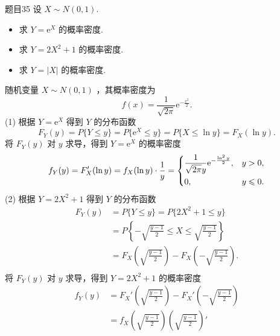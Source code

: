 \begin{question}{题目35}
    设 $X \sim N(0,1)$.
    \begin{itemize}
        \item [(1)] 求 $Y=\mathrm{e}^X$ 的概率密度.
        \item [(2)] 求 $Y=2X^2 + 1$ 的概率密度.
        \item [(3)] 求 $Y=|X|$ 的概率密度.
    \end{itemize}
\end{question}
\begin{solution}
    随机变量 $X \sim N(0,1)$ ，其概率密度为
    $$
        f(x) = \frac{1}{\sqrt{2\pi}}\mathrm{e}^{-\frac{x^2}{2}}.
    $$
    (1) 根据 $Y = \mathrm{e}^X$ 得到 $Y$ 的分布函数
    $$
        F_Y(y)
        = P\{Y \leqslant y\}
        = P\{\mathrm{e}^X \leqslant y\}
        = P\{X \leqslant \ln y\}
        = F_X(\ln{y}).
    $$
    将 $F_Y(y)$ 对 $y$ 求导，得到 $Y=\mathrm{e}^X$ 的概率密度
    $$
        \begin{aligned}
            f_Y(y)
            = F_X'(\ln{y}) = f_X(\ln{y})\cdot\frac{1}{y}
            = \begin{dcases}
                  \frac{1}{\sqrt{2\pi}y}\mathrm{e}^{-\frac{\ln^2y}{2}}, & y > 0,         \\
                  0 ,                                                   & y \leqslant 0.
              \end{dcases}
        \end{aligned}
    $$
    (2) 根据 $Y=2X^2+1$ 得到 $Y$ 的分布函数
    $$
        \begin{aligned}
            F_Y(y)
             & = P\{Y \leqslant y\} = P\{2X^2+1 \leqslant y\}                                     \\
             & = P\left\{-\sqrt{\frac{y-1}{2}} \leqslant X \leqslant \sqrt{\frac{y-1}{2}}\right\} \\
             & = F_X\left(\sqrt{\frac{y-1}{2}}\right) - F_X\left(-\sqrt{\frac{y-1}{2}}\right).    \\
        \end{aligned}
    $$
    将 $F_Y(y)$ 对 $y$ 求导，得到 $Y = 2X^2+1$ 的概率密度
    $$
        \begin{aligned}
            f_Y(y)
             & = F_X'\left(\sqrt{\frac{y-1}{2}}\right)
            - F_X'\left(-\sqrt{\frac{y-1}{2}}\right)                                                       \\
             & = f_X\left(\sqrt{\frac{y-1}{2}}\right)\left(\sqrt{\frac{y-1}{2}}\right)'

\end{aligned}$$
\end{solution}
